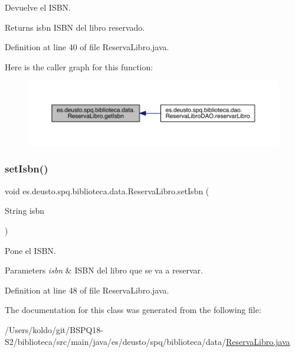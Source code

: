 Devuelve el I\+S\+BN. \begin{DoxyReturn}{Returns}
isbn I\+S\+BN del libro reservado. 
\end{DoxyReturn}


Definition at line 40 of file Reserva\+Libro.\+java.

Here is the caller graph for this function\+:
\nopagebreak
\begin{figure}[H]
\begin{center}
\leavevmode
\includegraphics[width=350pt]{classes_1_1deusto_1_1spq_1_1biblioteca_1_1data_1_1_reserva_libro_afca610a6ce88f886269834aec8ff4832_icgraph}
\end{center}
\end{figure}
\mbox{\label{classes_1_1deusto_1_1spq_1_1biblioteca_1_1data_1_1_reserva_libro_ac4d752a8b40d57f462120856da5661df}} 
\subsubsection{\texorpdfstring{set\+Isbn()}{setIsbn()}}
{\footnotesize\ttfamily void es.\+deusto.\+spq.\+biblioteca.\+data.\+Reserva\+Libro.\+set\+Isbn (\begin{DoxyParamCaption}\item[{String}]{isbn }\end{DoxyParamCaption})}

Pone el I\+S\+BN. 
\begin{DoxyParams}{Parameters}
{\em isbn} & I\+S\+BN del libro que se va a reservar. \\
\hline
\end{DoxyParams}


Definition at line 48 of file Reserva\+Libro.\+java.



The documentation for this class was generated from the following file\+:\begin{DoxyCompactItemize}
\item 
/\+Users/koldo/git/\+B\+S\+P\+Q18-\/\+S2/biblioteca/src/main/java/es/deusto/spq/biblioteca/data/\mbox{\hyperlink{_reserva_libro_8java}{Reserva\+Libro.\+java}}\end{DoxyCompactItemize}
